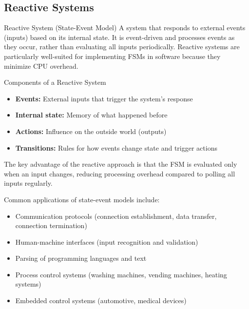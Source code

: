 \subsection{Reactive Systems}

\begin{definition}{Reactive System (State-Event Model)}
A system that responds to external events (inputs) based on its internal state. It is event-driven and processes events as they occur, rather than evaluating all inputs periodically. Reactive systems are particularly well-suited for implementing FSMs in software because they minimize CPU overhead.
\end{definition}

\begin{concept}{Components of a Reactive System}
\begin{itemize}
    \item \textbf{Events:} External inputs that trigger the system's response
    \item \textbf{Internal state:} Memory of what happened before
    \item \textbf{Actions:} Influence on the outside world (outputs)
    \item \textbf{Transitions:} Rules for how events change state and trigger actions
\end{itemize}

The key advantage of the reactive approach is that the FSM is evaluated only when an input changes, reducing processing overhead compared to polling all inputs regularly.
\end{concept}

\begin{example2}
Common applications of state-event models include:
\begin{itemize}
    \item Communication protocols (connection establishment, data transfer, connection termination)
    \item Human-machine interfaces (input recognition and validation)
    \item Parsing of programming languages and text
    \item Process control systems (washing machines, vending machines, heating systems)
    \item Embedded control systems (automotive, medical devices)
\end{itemize}
\end{example2}

\raggedcolumns
\columnbreak

